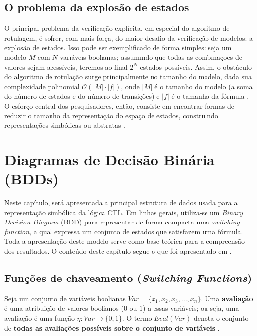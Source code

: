 \documentclass[cic,tc]{infufrgs}
\begin{document}
	
	\section{O problema da explosão de estados}
	
	O principal problema da verificação explícita, em especial do algoritmo de rotulagem, é sofrer, com mais força, do maior desafio da verificação de modelos: a explosão de estados. 
	Isso pode ser exemplificado de forma simples: seja um modelo $M$ com $N$ variáveis boolianas; assumindo que todas as combinações de valores sejam acessíveis, teremos ao final $2^N$ estados possíveis.
	Assim, o obstáculo do algoritmo de rotulação surge principalmente no tamanho do modelo, dada sua complexidade polinomial $\mathcal{O}(\lvert M \rvert \cdot \lvert f \rvert)$, onde $\lvert M \rvert$ é o tamanho do modelo (a soma do número de estados e do número de transições) e $\lvert f \rvert$ é o tamanho da fórmula \cite{baierPrinciplesModelChecking2008a}.
	O esforço central dos pesquisadores, então, consiste em encontrar formas de reduzir o tamanho da representação do espaço de estados, construindo representações simbólicas ou abstratas \cite{clarkeIntroductionModelChecking2018}.
	
	
	\chapter{Diagramas de Decisão Binária (BDDs)}
	
	Neste capítulo, será apresentada a principal estrutura de dados usada para a representação simbólica da lógica CTL. 
	Em linhas gerais, utiliza-se um \textit{Binary Decision Diagram} (BDD) para representar de forma compacta uma \textit{switching function}, a qual expressa um conjunto de estados que satisfazem uma fórmula. 
	Toda a apresentação deste modelo serve como base teórica para a compreensão dos resultados. O conteúdo deste capítulo segue o que foi apresentado em .
	
	\section{Funções de chaveamento (\textit{Switching Functions})}
	
	Seja um conjunto de variáveis boolianas $Var = \{x_1,x_2,x_3,...,x_n\}$. 
	Uma \textbf{avaliação} é uma atribuição de valores boolianos ($0$ ou $1$) a essas variáveis; ou seja, uma avaliação é uma função $\eta: Var \to \{0,1\}$. 
	O termo $Eval(Var)$ denota o conjunto de \textbf{todas as avaliações possíveis sobre o conjunto de variáveis} \cite{baierPrinciplesModelChecking2008a}.
	
\end{document}
